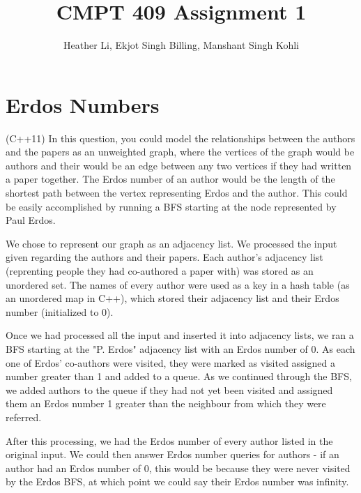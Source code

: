 \documentclass{article}
\title{CMPT 409 Assignment 1}
\author{Heather Li, Ekjot Singh Billing, Manshant Singh Kohli}
\begin{document}
\maketitle

\section{Erdos Numbers}
(C++11) In this question, you could model the relationships between the authors and the papers as an unweighted graph, where the vertices of the graph would be authors and their would be an edge between any two vertices if they had written a paper together. 
The Erdos number of an author would be the length of the shortest path between the vertex representing Erdos and the author. 
This could be easily accomplished by running a BFS starting at the node represented by Paul Erdos.
\par
We chose to represent our graph as an adjacency list. 
We processed the input given regarding the authors and their papers. 
Each author's adjacency list (reprenting people they had co-authored a paper with) was stored as an unordered set. 
The names of every author were used as a key in a hash table (as an unordered map in C++), which stored their adjacency list and their Erdos number (initialized to 0).
\par
Once we had processed all the input and inserted it into adjacency lists, we ran a BFS starting at the "P. Erdos" adjacency list with an Erdos number of 0. 
As each one of Erdos' co-authors were visited, they were marked as visited assigned a number greater than 1 and added to a queue.
As we continued through the BFS, we added authors to the queue if they had not yet been visited and assigned them an Erdos number 1 greater than the neighbour from which they were referred.
\par
After this processing, we had the Erdos number of every author listed in the original input. 
We could then answer Erdos number queries  for authors - if an author had an Erdos number of 0, this would be because they were never visited by the Erdos BFS, at which point we could say their Erdos number was infinity.
\end{document}
